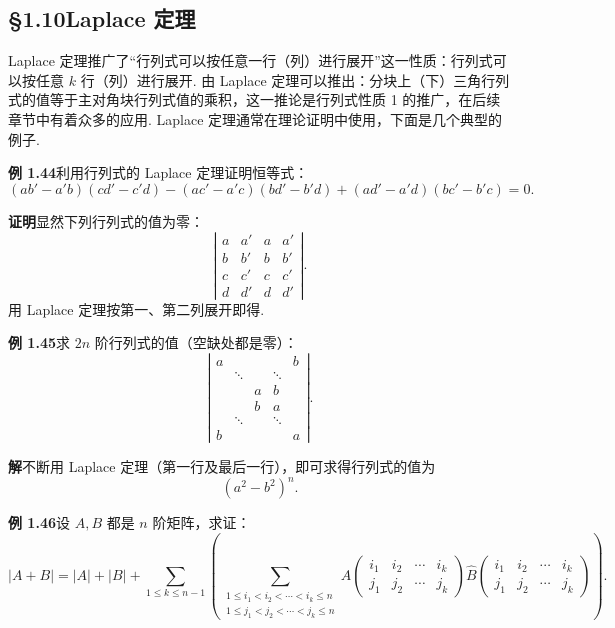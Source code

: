 \documentclass[UTF8, 12pt, fontset=fandol, oneside]{ctexart}
\begin{document}
\subsection*{§1.10\quad Laplace 定理}

Laplace 定理推广了“行列式可以按任意一行（列）进行展开”这一性质：行列式可以按任意 $k$ 行（列）进行展开. 由 Laplace 定理可以推出：分块上（下）三角行列式的值等于主对角块行列式值的乘积，这一推论是行列式性质 1 的推广，在后续章节中有着众多的应用. Laplace 定理通常在理论证明中使用，下面是几个典型的例子.

\noindent\textbf{例 1.44}\quad 利用行列式的 Laplace 定理证明恒等式：
\[
(ab'-a'b)(cd'-c'd)-(ac'-a'c)(bd'-b'd)+(ad'-a'd)(bc'-b'c)=0.
\]

\noindent\textbf{证明}\quad 显然下列行列式的值为零：
\[
\left|\begin{array}{cccc}
a & a' & a & a'\\
b & b' & b & b'\\
c & c' & c & c'\\
d & d' & d & d'
\end{array}\right|.
\]
用 Laplace 定理按第一、第二列展开即得.

\noindent\textbf{例 1.45}\quad 求 $2n$ 阶行列式的值（空缺处都是零）：
\[
\left|\begin{array}{ccccc}
a &        &        &        & b\\
  & \ddots &        & \ddots & \\
  &        & a & b  & \\
  &        & b & a  & \\
  & \ddots &       & \ddots & \\
b &        &        &        & a
\end{array}\right|.
\]

\noindent\textbf{解}\quad 不断用 Laplace 定理（第一行及最后一行），即可求得行列式的值为
\[
(a^2-b^2)^n.
\]

\noindent\textbf{例 1.46}\quad 设 $A,B$ 都是 $n$ 阶矩阵，求证：
\[
|A+B|=|A|+|B|+
\sum_{1\le k\le n-1}
\left(
\sum_{\substack{1\le i_1<i_2<\cdots<i_k\le n\\
1\le j_1<j_2<\cdots<j_k\le n}}
A\begin{pmatrix}i_1&i_2&\cdots&i_k\\ j_1&j_2&\cdots&j_k\end{pmatrix}
\widehat{B}\begin{pmatrix}i_1&i_2&\cdots&i_k\\ j_1&j_2&\cdots&j_k\end{pmatrix}
\right).
\]
\end{document}
